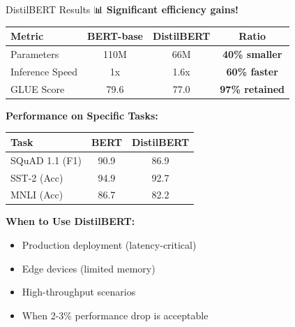 \documentclass[aspectratio=169]{beamer}
\begin{document}
\begin{frame}{DistilBERT Results 📊}
\textbf{Significant efficiency gains!}

\vspace{1em}

\begin{center}
\begin{tabular}{lccc}
\toprule
\textbf{Metric} & \textbf{BERT-base} & \textbf{DistilBERT} & \textbf{Ratio} \\
\midrule
Parameters & 110M & 66M & \textbf{40\% smaller} \\
Inference Speed & 1x & 1.6x & \textbf{60\% faster} \\
GLUE Score & 79.6 & 77.0 & \textbf{97\% retained} \\
\bottomrule
\end{tabular}
\end{center}

\vspace{1em}

\textbf{Performance on Specific Tasks:}
\begin{center}
\small
\begin{tabular}{lcc}
\toprule
\textbf{Task} & \textbf{BERT} & \textbf{DistilBERT} \\
\midrule
SQuAD 1.1 (F1) & 90.9 & 86.9 \\
SST-2 (Acc) & 94.9 & 92.7 \\
MNLI (Acc) & 86.7 & 82.2 \\
\bottomrule
\end{tabular}
\end{center}

\vspace{1em}

\textbf{When to Use DistilBERT:}
\begin{itemize}\setlength{\itemsep}{0pt}
    \item Production deployment (latency-critical)
    \item Edge devices (limited memory)
    \item High-throughput scenarios
    \item When 2-3\% performance drop is acceptable
\end{itemize}
\end{frame}
\end{document}
